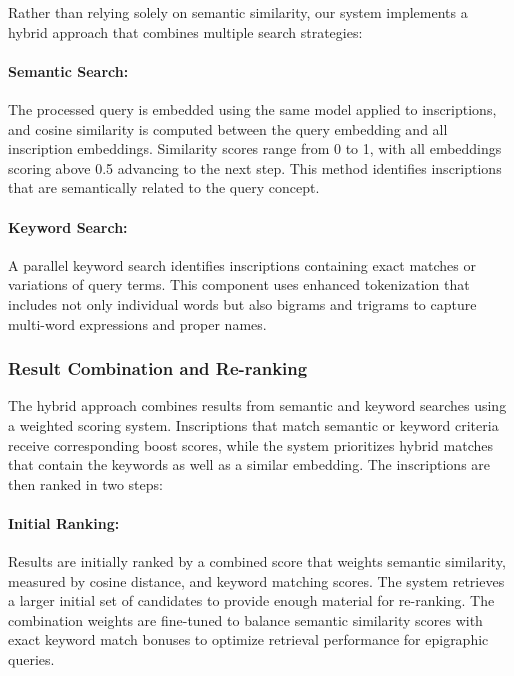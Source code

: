 \documentclass[final,greek,american]{anthology-ch}
\begin{document}
Rather than relying solely on semantic similarity, our system implements a hybrid approach that combines multiple search strategies:

\paragraph{Semantic Search:} The processed query is embedded using the same model applied to inscriptions, and cosine similarity is computed between the query embedding and all inscription embeddings. Similarity scores range from 0 to 1, with all embeddings scoring above 0.5 advancing to the next step. This method identifies inscriptions that are semantically related to the query concept.

\paragraph{Keyword Search:} A parallel keyword search identifies inscriptions containing exact matches or variations of query terms. This component uses enhanced tokenization that includes not only individual words but also bigrams and trigrams to capture multi-word expressions and proper names.

\subsubsection{Result Combination and Re-ranking}

The hybrid approach combines results from semantic and keyword searches using a weighted scoring system.
Inscriptions that match semantic or keyword criteria receive corresponding boost scores, while the system prioritizes hybrid matches that contain the keywords as well as a similar embedding.
The inscriptions are then ranked in two steps:

\paragraph{Initial Ranking:} Results are initially ranked by a combined score that weights semantic similarity, measured by cosine distance, and keyword matching scores. The system retrieves a larger initial set of candidates to provide enough material for re-ranking. The combination weights are fine-tuned to balance semantic similarity scores with exact keyword match bonuses to optimize retrieval performance for epigraphic queries.
\end{document}
